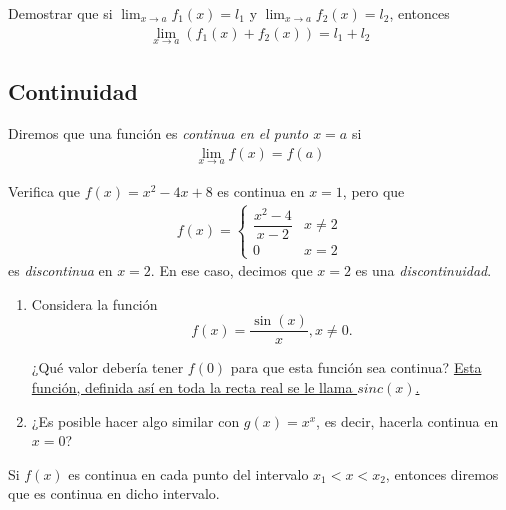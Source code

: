 \begin{resuelto}
	Demostrar que si $\lim_{x\to a}f_{1}(x)=l_{1}$ y $\lim_{x\to a}f_{2}(x)=l_{2}$, entonces
	\begin{align*}
		\lim_{x\to a}\left( f_{1}(x)+f_{2}(x) \right)=l_{1}+l_{2}
	\end{align*}
\end{resuelto}


\subsection{Continuidad}

  Diremos que una función es \emph{continua en el punto $x=a$} si
  \begin{align*}
   \lim_{x\to a} f(x)=f(a)
   \end{align*}

  \begin{resuelto}
   Verifica que $f(x)=x^{2}-4x+8$ es continua en $x=1$, pero que
   \begin{align*}
   f(x)=
    \begin{cases}
\dfrac{x^2-4}{x-2}& x\neq 2\\
0 & x= 2
\end{cases}
    \end{align*}
    es \emph{discontinua} en $x=2$.    En ese caso, decimos que $x=2$ es una \emph{discontinuidad}.
  \end{resuelto}

\begin{resuelto}

 \begin{enumerate}
 	\item Considera la función
 	\[ f(x) = \dfrac{\sin(x)}{x}, x\neq 0 .\]

 	¿Qué valor debería tener $ f(0) $ para que esta función sea continua? \href{https://mathworld.wolfram.com/SincFunction.html}{Esta función, definida así en toda la recta real se le llama $ sinc(x) $. }
 	\item ¿Es posible hacer algo similar con
 	$ g(x) = x^x $, es decir, hacerla continua en $ x=0 $?
 \end{enumerate}
\end{resuelto}

\begin{definicion}
	Si $f(x)$ es continua en cada punto del intervalo $x_{1}<x<x_{2}$, entonces diremos que es continua en dicho intervalo.
\end{definicion}


